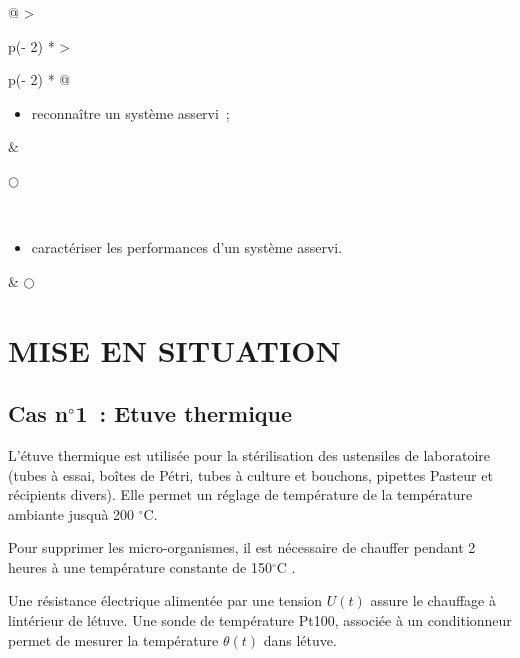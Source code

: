 \begin{longtable}[]{@{}
  >{\raggedright\arraybackslash}p{(\columnwidth - 2\tabcolsep) * }
  >{\raggedright\arraybackslash}p{(\columnwidth - 2\tabcolsep) * }@{}}
\toprule\noalign{}
\begin{minipage}[b]{\linewidth}\raggedright
\begin{itemize}
\item
  reconnaître un système asservi~;
\end{itemize}
\end{minipage} & \begin{minipage}[b]{\linewidth}\raggedright
$\bigcirc$
\end{minipage} \\
\midrule\noalign{}
\endhead
\bottomrule\noalign{}
\endlastfoot
\begin{minipage}[t]{\linewidth}\raggedright
\begin{itemize}
\item
  caractériser les performances d'un système asservi.
\end{itemize}
\end{minipage} & $\bigcirc$ \\
\end{longtable}

\section{MISE EN SITUATION}\label{mise-en-situation}

\subsection[Cas n$^\circ$1~: Etuve
thermique]{Cas n$^\circ$1~: Etuve thermique}\label{cas-n1-etuve-thermique}

L'étuve thermique est utilisée pour la stérilisation des ustensiles de
laboratoire (tubes à essai, boîtes de Pétri, tubes à culture et
bouchons, pipettes Pasteur et récipients divers). Elle permet un réglage
de température de la température ambiante jusqu\textquotesingle à 200
$^\circ$C.

Pour supprimer les micro-organismes, il est nécessaire de chauffer
pendant 2 heures à une température constante de 150$^\circ$C .

Une
résistance électrique alimentée par une tension \(U(t)\) assure le
chauffage à l\textquotesingle intérieur de l\textquotesingle étuve. Une
sonde de température Pt100, associée à un conditionneur permet de
mesurer la température \(\theta(t)\) dans l\textquotesingle étuve.

